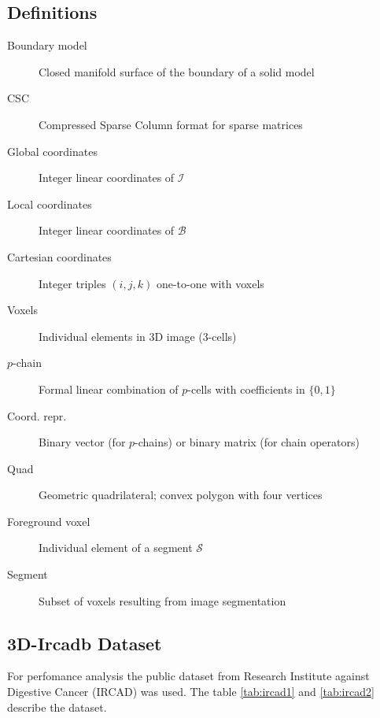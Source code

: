 \documentclass[11pt, oneside]{amsart}   	%
\begin{document}
\subsection{Definitions}
\begin{description}

\item[Boundary model] Closed manifold surface of the boundary of a solid model
\item[CSC]  Compressed Sparse Column format for sparse matrices
\item[Global coordinates]  Integer linear coordinates of $\mathcal{I}$
\item[Local coordinates] Integer linear coordinates of $\mathcal{B}$
\item[Cartesian coordinates] Integer triples $(i,j,k)$ one-to-one with voxels
\item[Voxels] Individual elements in 3D image (3-cells)
\item[$p$-chain] Formal linear combination of $p$-cells with coefficients in $\{0,1\}$
\item[Coord. repr.]  Binary vector (for $p$-chains) or binary matrix (for chain operators)
\item[Quad]	Geometric quadrilateral; convex polygon with four vertices
\item[Foreground voxel] Individual element of a segment $\mathcal{S}$
\item[Segment]	Subset of voxels resulting from image segmentation
\end{description}

\subsection{3D-Ircadb Dataset}

For perfomance analysis the public dataset from Research Institute against Digestive Cancer (IRCAD) \cite{ircadb} was used. The table \ref{tab:ircad1} and \ref{tab:ircad2} describe the dataset.

\begin{table}

\label{tab:ircad1}
\end{table}

\begin{table}

\label{tab:ircad2}
\end{table}

\clearpage{}

% 

\end{document}
